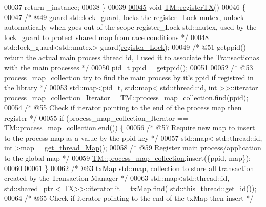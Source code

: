 \begin{DoxyCode}
00037     \textcolor{keywordflow}{return} \_instance;
00038 \}
00039 
\hypertarget{_t_m_8cpp_source.tex_l00045}{}\hyperlink{class_t_m_a26ea481c24d9aa3aebd6dafb7253376e_a26ea481c24d9aa3aebd6dafb7253376e}{00045} \textcolor{keywordtype}{void} \hyperlink{class_t_m_a26ea481c24d9aa3aebd6dafb7253376e_a26ea481c24d9aa3aebd6dafb7253376e}{TM::registerTX}()
00046 \{
00047   \textcolor{comment}{/* @49 guard std::lock\_guard, locks the register\_Lock mutex, unlock automatically when goes out of the
       scope register\_Lock std::mutex, used by the lock\_guard to protect shared map from race conditions */}
00048     std::lock\_guard<std::mutex> guard(\hyperlink{class_t_m_aeb26546681bfe64e21606b8c012bb8c3_aeb26546681bfe64e21606b8c012bb8c3}{register\_Lock});
00049     \textcolor{comment}{/* @51 getppid() return the actual main process thread id, I used it to associate the Transactionas
       with the main processes */}
00050     pid\_t ppid = getppid();
00051 
00052     \textcolor{comment}{/* @53 process\_map\_collection try to find the main process by it's ppid if registred in the library */}
00053     std::map<pid\_t, std::map< std::thread::id, int >>::iterator process\_map\_collection\_Iterator = 
      \hyperlink{class_t_m_a6d417b18213968da2a70a914e80d639b_a6d417b18213968da2a70a914e80d639b}{TM::process\_map\_collection}.find(ppid);
00054     \textcolor{comment}{/* @55 Check if iterator pointing to the end of the process map then register */}
00055     \textcolor{keywordflow}{if} (process\_map\_collection\_Iterator == \hyperlink{class_t_m_a6d417b18213968da2a70a914e80d639b_a6d417b18213968da2a70a914e80d639b}{TM::process\_map\_collection}.end()) \{
00056         \textcolor{comment}{/* @57 Require new map to insert to the process map as a value by the ppid key  */}
00057         std::map< std::thread::id, int >map = \hyperlink{class_t_m_afb8bc9f42fe06c52747beb7f4c46915c_afb8bc9f42fe06c52747beb7f4c46915c}{get\_thread\_Map}();
00058         \textcolor{comment}{/* @59 Register main process/application to the global map  */}
00059         \hyperlink{class_t_m_a6d417b18213968da2a70a914e80d639b_a6d417b18213968da2a70a914e80d639b}{TM::process\_map\_collection}.insert(\{ppid, map\});
00060 
00061     \}
00062     \textcolor{comment}{/* @63 txMap std::map, collection to store all transaction created by the Transaction Manager */}
00063     std::map<std::thread::id, std::shared\_ptr < TX>>::iterator it = \hyperlink{class_t_m_a0333dfa193ea99d7626de74a2b932e9b_a0333dfa193ea99d7626de74a2b932e9b}{txMap}.find(
      std::this\_thread::get\_id());
00064     \textcolor{comment}{/* @65 Check if iterator pointing to the end of the txMap then insert */}

\end{DoxyCode}
